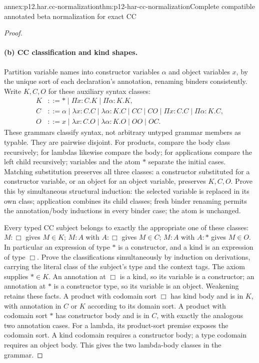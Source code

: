 \begin{annexitem}{annex:p12.har.cc-normalization}{thm:p12-har-cc-normalization}{Complete compatible annotated beta normalization for exact CC}
\begin{proof}
\paragraph{(b) CC classification and kind shapes.}
Partition variable names into constructor variables \(\alpha\) and
object variables \(x\), by the unique sort of each declaration's
annotation, renaming binders consistently. Write \(K,C,O\) for these
auxiliary syntax classes:
\[
\begin{aligned}
 K&::=\ast\mid\Pi x:C.K\mid\Pi\alpha:K.K,\\
 C&::=\alpha\mid\lambda x:C.C\mid\lambda\alpha:K.C
       \mid CC\mid CO\mid\Pi x:C.C\mid\Pi\alpha:K.C,\\
 O&::=x\mid\lambda x:C.O\mid\lambda\alpha:K.O\mid OO\mid OC.
\end{aligned}
\]
These grammars classify syntax, not arbitrary untyped grammar members
as typable. They are pairwise disjoint. For products, compare the body
class recursively; for lambdas likewise compare the body; for applications
compare the left child recursively; variables and the atom \(\ast\)
separate the initial cases. Matching substitution preserves all three
classes: a constructor substituted for a constructor variable, or an
object for an object variable, preserves \(K,C,O\). Prove this by
simultaneous structural induction: the selected variable is replaced
in its own class; application combines its child classes; fresh binder
renaming permits the annotation/body inductions in every binder case;
the atom is unchanged.

Every typed CC subject belongs to exactly the appropriate one of these
classes: \(M:\Box\) gives \(M\in K\); \(M:A\) with
\(A:\Box\) gives \(M\in C\); \(M:A\) with \(A:\ast\) gives
\(M\in O\). In particular an expression of type \(\ast\) is a
constructor, and a kind is an expression of type \(\Box\).
Prove the classifications simultaneously by induction on derivations,
carrying the literal class of the subject's type and the context tags.
The axiom supplies \(\ast\in K\). An annotation at \(\Box\) is a
kind, so its variable is a constructor; an annotation at \(\ast\)
is a constructor type, so its variable is an object. Weakening retains
these facts. A product with codomain sort \(\Box\) has kind body and
is in \(K\), with annotation in \(C\) or \(K\) according to its
domain sort. A product with codomain sort \(\ast\) has constructor
body and is in \(C\), with exactly the analogous two annotation cases.
For a lambda, its product-sort premise exposes the codomain sort. A
kind codomain requires a constructor body; a type codomain requires an
object body. This gives the two lambda-body classes in the grammar.


\end{proof}
\end{annexitem}
